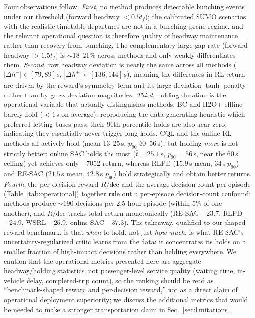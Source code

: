 \documentclass[journal,10pt]{IEEEtran}
\begin{document}
Four observations follow. \emph{First}, no method produces detectable bunching events under our threshold (forward headway $< 0.5 t_f$); the calibrated SUMO scenarios with the realistic timetable departures are not in a bunching-prone regime, and the relevant operational question is therefore quality of headway maintenance rather than recovery from bunching. The complementary large-gap rate (forward headway $>1.5 t_f$) is $\sim$18--21\% across methods and only weakly differentiates them. \emph{Second}, raw headway deviation is nearly the same across all methods ($|\Delta h^-| \in [79, 89]$\,s, $|\Delta h^+| \in [136, 144]$\,s), meaning the differences in RL return are driven by the reward's symmetry term and its large-deviation $\tanh$ penalty rather than by gross deviation magnitudes. \emph{Third}, holding duration is the operational variable that actually distinguishes methods. BC and H2O+ offline barely hold ($<1$\,s on average), reproducing the data-generating heuristic which preferred letting buses pass; their 90th-percentile holds are also near-zero, indicating they essentially never trigger long holds. CQL and the online RL methods all actively hold (mean 13--25\,s, $p_{90}$ 30--56\,s), but holding \emph{more} is not strictly better: online SAC holds the most ($\bar{t}=25.1$\,s, $p_{90}=56$\,s, near the 60\,s ceiling) yet achieves only $-7052$ return, whereas RLPD ($15.9$\,s mean, $34$\,s $p_{90}$) and RE-SAC ($21.5$\,s mean, $42.8$\,s $p_{90}$) hold strategically and obtain better returns. \emph{Fourth}, the per-decision reward $R/\text{dec}$ and the average decision count per episode (Table~\ref{tab:operational}) together rule out a per-episode decision-count confound: methods produce $\sim$190 decisions per 2.5-hour episode (within 5\% of one another), and $R/\text{dec}$ tracks total return monotonically (RE-SAC $-23.7$, RLPD $-24.9$, WSRL $-25.9$, online SAC $-37.3$). The takeaway, qualified to our shaped-reward benchmark, is that \emph{when} to hold, not just \emph{how much}, is what RE-SAC's uncertainty-regularized critic learns from the data: it concentrates its holds on a smaller fraction of high-impact decisions rather than holding everywhere. We caution that the operational metrics presented here are aggregate headway/holding statistics, not passenger-level service quality (waiting time, in-vehicle delay, completed-trip count), so the ranking should be read as ``benchmark-shaped reward and per-decision reward,'' not as a direct claim of operational deployment superiority; we discuss the additional metrics that would be needed to make a stronger transportation claim in Sec.~\ref{sec:limitations}.
\end{document}
